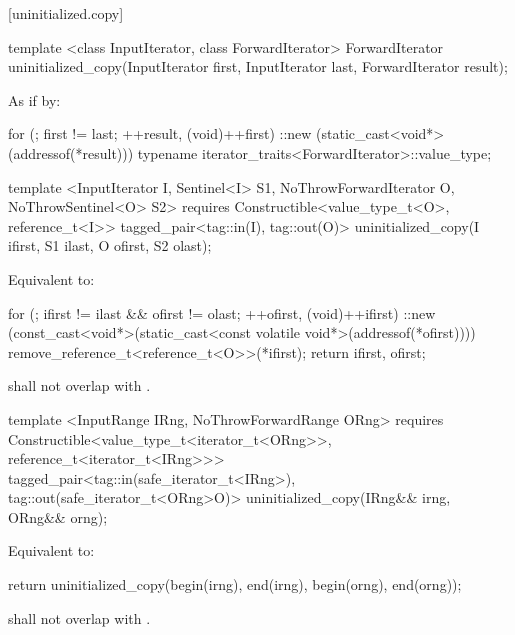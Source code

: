 [uninitialized.copy]{}
{\color{remclr}
\begin{codeblock}
template <class InputIterator, class ForwardIterator>
  ForwardIterator uninitialized_copy(InputIterator first, InputIterator last,
                                     ForwardIterator result);
\end{codeblock}

\setcounter{Paras}{0}
\pnum
\effects As if by:
\begin{codeblock}
    for (; first != last; ++result, (void)++first)
      ::new (static_cast<void*>(addressof(*result)))
        typename iterator_traits<ForwardIterator>::value_type;
\end{codeblock}

\setcounter{Paras}{1}
\pnum
\returns {}
} %

{\color{addclr}
\begin{codeblock}
template <InputIterator I, Sentinel<I> S1, NoThrowForwardIterator O, NoThrowSentinel<O> S2>
  requires
Constructible<value_type_t<O>, reference_t<I>>
  tagged_pair<tag::in(I), tag::out(O)>
uninitialized_copy(I ifirst, S1 ilast, O ofirst, S2 olast);
\end{codeblock}

\setcounter{Paras}{0}
\pnum
\effects Equivalent to:
\begin{codeblock}
    for (; ifirst != ilast && ofirst != olast; ++ofirst, (void)++ifirst) {
      ::new (const_cast<void*>(static_cast<const volatile void*>(addressof(*ofirst))))
        remove_reference_t<reference_t<O>>(*ifirst);
    }
    return {ifirst, ofirst};
\end{codeblock}

\pnum
\requires {} shall not overlap with .

\begin{codeblock}
template <InputRange IRng, NoThrowForwardRange ORng>
requires
  Constructible<value_type_t<iterator_t<ORng>>, reference_t<iterator_t<IRng>>>
tagged_pair<tag::in(safe_iterator_t<IRng>), tag::out(safe_iterator_t<ORng>O)>
  uninitialized_copy(IRng&& irng, ORng&& orng);
\end{codeblock}

\pnum
\effects Equivalent to:
\begin{codeblock}
    return uninitialized_copy(begin(irng), end(irng), begin(orng), end(orng));
\end{codeblock}

\pnum
\requires {} shall not overlap with .
} %

